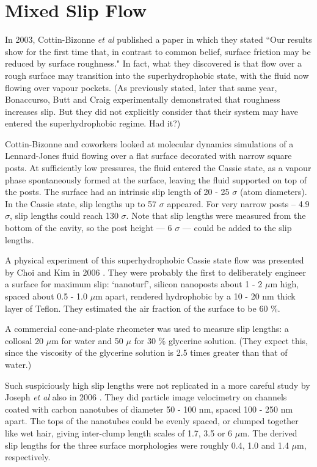 \documentclass[12pt, a4paper, twoside, openright]{book}
\begin{document}
\section{Mixed Slip Flow}

In 2003, Cottin-Bizonne \emph{et al} published a paper \cite{Cottin-Bizonne2003} in which they stated ``Our results show for the first time that, in contrast to common belief, surface friction may be reduced by surface roughness."  In fact, what they discovered is that flow over a rough surface may transition into the superhydrophobic state, with the fluid now flowing over vapour pockets.  (As previously stated, later that same year, Bonaccurso, Butt and Craig \cite{BonaccursoButtCraig2003} experimentally demonstrated that roughness increases slip. But they did not explicitly consider that their system may have entered the superhydrophobic regime.  Had it?)

Cottin-Bizonne and coworkers looked at molecular dynamics simulations of a Lennard-Jones fluid flowing over a flat surface decorated with narrow square posts.  At sufficiently low pressures, the fluid entered the Cassie state, as a vapour phase spontaneously formed at the surface, leaving the fluid supported on top of the posts.  The surface had an intrinsic slip length of 20 - 25 $\sigma$ (atom diameters).  In the Cassie state, slip lengths up to 57 $\sigma$ appeared.  For very narrow posts -- 4.9 $\sigma$, slip lengths could reach 130 $\sigma$.  Note that slip lengths were measured from the bottom of the cavity, so the post height --- 6 $\sigma$ --- could be added to the slip lengths.


A physical experiment of this superhydrophobic Cassie state flow was presented by Choi and Kim in 2006 \cite{ChoiKim2006}.  They were probably the first to deliberately engineer a surface for maximum slip: `nanoturf', silicon nanoposts about 1 - 2 $\mu$m high, spaced about 0.5 - 1.0 $\mu$m apart, rendered hydrophobic by a 10 - 20 nm thick layer of Teflon.  They estimated the air fraction of the surface to be 60 \%.

A commercial cone-and-plate rheometer was used to measure slip lengths: a collosal 20 $\mu$m for water and 50 $\mu$ for 30 \% glycerine solution.  (They expect this, since the viscosity of the glycerine solution is 2.5 times greater than that of water.)

Such suspiciously high slip lengths were not replicated in a more careful study by Joseph \emph{et al} also in 2006 \cite{Joseph2006}.  They did particle image velocimetry on channels coated with carbon nanotubes of diameter 50 - 100 nm, spaced 100 - 250 nm apart.  The tops of the nanotubes could be evenly spaced, or clumped together like wet hair, giving inter-clump length scales of 1.7, 3.5 or 6 $\mu$m.  The derived slip lengths for the three surface morphologies were roughly 0.4, 1.0 and 1.4 $\mu$m, respectively.
\end{document}

